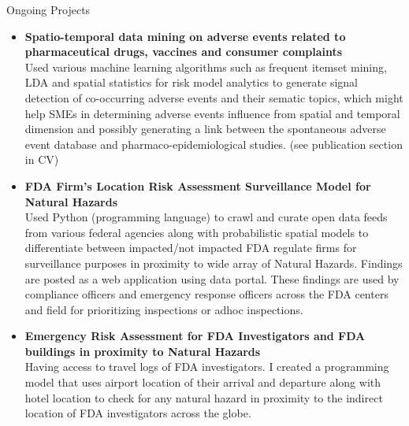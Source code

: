 \documentclass[letterpaper]{twentysecondcv} %
\begin{document}
\begin{twenty}
 \twentyitem
    
    
        {Ongoing Projects}        
        {}
        {
        {\begin{itemize}
        
   \item \textbf{Spatio-temporal data mining on adverse events related to pharmaceutical drugs, vaccines and consumer complaints}\\
Used various machine learning algorithms such as frequent itemset mining, LDA and spatial statistics for risk model analytics to generate signal detection of co-occurring adverse events and their sematic topics, which might help SMEs in determining adverse events influence from spatial and temporal dimension and possibly generating a link between the spontaneous adverse event database and pharmaco-epidemiological studies. (see publication section in CV)
   \item \textbf{FDA Firm’s Location Risk Assessment Surveillance Model for Natural Hazards}\\
Used Python (programming language) to crawl and curate open data feeds from various federal agencies along with probabilistic spatial models to differentiate between impacted/not impacted FDA regulate firms for surveillance purposes in proximity to wide array of Natural Hazards. Findings are posted as a web application using data portal. These findings are used by compliance officers and emergency response officers across the FDA centers and field for prioritizing inspections or adhoc inspections. 
   \item \textbf{Emergency Risk Assessment for FDA Investigators and FDA buildings in proximity to Natural Hazards}\\
Having access to travel logs of FDA investigators. I created a programming model that uses airport location of their arrival and departure along with hotel location to check for any natural hazard in proximity to the indirect location of FDA investigators across the globe.  
          \end{itemize}}
        }
    \\
     \end{twenty}
\end{document}
